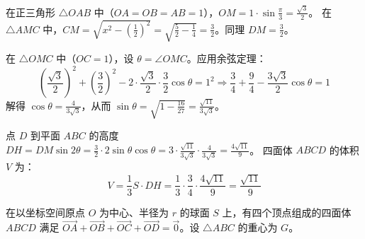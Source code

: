 \begin{questions}
\begin{parts}
\begin{solution}
        在正三角形 $\triangle OAB$ 中（$OA=OB=AB=1$），$OM = 1 \cdot \sin \frac{\pi}{3} = \frac{\sqrt{3}}{2}$。
        在 $\triangle AMC$ 中，$CM = \sqrt{x^2 - \left(\frac{1}{2}\right)^2} = \sqrt{\frac{5}{2} - \frac{1}{4}} = \frac{3}{2}$。同理 $DM = \frac{3}{2}$。
        
        在 $\triangle OMC$ 中（$OC=1$），设 $\theta = \angle OMC$。应用余弦定理：
        \[ \left(\frac{\sqrt{3}}{2}\right)^2 + \left(\frac{3}{2}\right)^2 - 2 \cdot \frac{\sqrt{3}}{2} \cdot \frac{3}{2} \cos \theta = 1^2 \Rightarrow \frac{3}{4} + \frac{9}{4} - \frac{3\sqrt{3}}{2} \cos \theta = 1 \text{} \]
        解得 $\cos \theta = \frac{4}{3\sqrt{3}}$，从而 $\sin \theta = \sqrt{1 - \frac{16}{27}} = \frac{\sqrt{11}}{3\sqrt{3}}$。
        
        点 $D$ 到平面 $ABC$ 的高度 $DH = DM \sin 2\theta = \frac{3}{2} \cdot 2 \sin \theta \cos \theta = 3 \cdot \frac{\sqrt{11}}{3\sqrt{3}} \cdot \frac{4}{3\sqrt{3}} = \frac{4\sqrt{11}}{9}$。
        四面体 $ABCD$ 的体积 $V$ 为：
        \[ V = \frac{1}{3} S \cdot DH = \frac{1}{3} \cdot \frac{3}{4} \cdot \frac{4\sqrt{11}}{9} = \frac{\sqrt{11}}{9} \text{} \]
    \end{solution}
\end{parts}

\question
在以坐标空间原点 $O$ 为中心、半径为 $r$ 的球面 $S$ 上，有四个顶点组成的四面体 $ABCD$ 满足 $\overrightarrow{OA} + \overrightarrow{OB} + \overrightarrow{OC} + \overrightarrow{OD} = \vec{0}$。设 $\triangle ABC$ 的重心为 $G$。

\end{questions}
